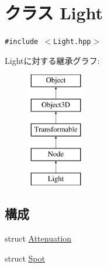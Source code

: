 \hypertarget{classm3g_1_1Light}{
\section{クラス Light}
\label{classm3g_1_1Light}
}
{\tt \#include $<$Light.hpp$>$}

Lightに対する継承グラフ:\begin{figure}[H]
\begin{center}
\leavevmode
\includegraphics[height=5cm]{classm3g_1_1Light}
\end{center}
\end{figure}
\subsection*{構成}
\begin{CompactItemize}
\item 
struct \hyperlink{structm3g_1_1Light_1_1Attenuation}{Attenuation}
\item 
struct \hyperlink{structm3g_1_1Light_1_1Spot}{Spot}
\end{CompactItemize}
